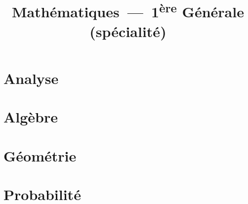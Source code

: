\documentclass{poly}
\title{Mathématiques~---~1\textsuperscript{ère} Générale (spécialité)}
\author{}
\date{\figureC{}}
\begin{document}
\maketitle
\tableofcontents
\part{Analyse}



\part{Algèbre}



\part{Géométrie}



\part{Probabilité}



\pagenotes
\end{document}
